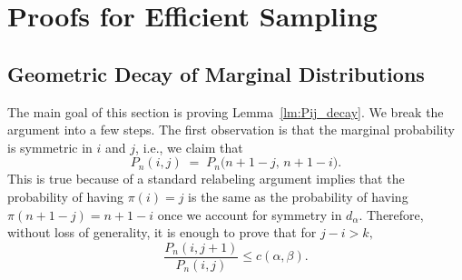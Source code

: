\documentclass{article}
\begin{document}


   





\section{Proofs for Efficient Sampling}


\subsection{Geometric Decay of Marginal Distributions}\label{proof: marginal}
The main goal of this section is proving Lemma~\ref{lm:Pij_decay}. We break the argument into a few steps.
The first observation is that the marginal probability is symmetric in $i$ and $j$, i.e., we claim that
\[
P_n(i,j) \;=\; P_n\bigl(n+1-j, \,n+1-i\bigr).
\] This is true because of a standard relabeling argument implies that the probability of having $\pi(i) = j$ is the same as the probability of having $\pi(n+1-j) = n+1-i$ once we account for symmetry in $d_\alpha$. Therefore, without loss of generality, it is enough to prove that  for $j-i>k,$
\[\frac{P_n(i, j+1)}{P_n(i, j)} \leq c(\alpha, \beta).\]
\end{document}
